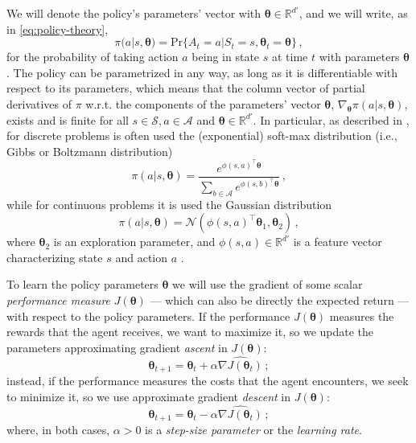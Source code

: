 We will denote the policy's parameters' vector with $\boldsymbol \theta \in \mathbb R^{d'}$, and we will write, as in \eqref{eq:policy-theory},
\begin{equation}
    \pi(a|s,\boldsymbol \theta) = \text{Pr}\{A_t = a | S_t = s, \boldsymbol \theta_t = \boldsymbol {\theta}\} \, ,
    \label{eq:policy-with-parameters}
\end{equation}
for the probability of taking action $a$ being in state $s$ at time $t$ with parameters $\boldsymbol \theta$ \cite{SuttonBarto}. The policy can be parametrized in any way, as long as it is differentiable with respect to its parameters, which means that the column vector of partial derivatives of $\pi$ w.r.t. the components of the parameters' vector $\boldsymbol \theta$, $\nabla_{\boldsymbol \theta} \pi (a|s,\boldsymbol \theta)$, exists and is finite for all $s \in \mathcal S, a \in \mathcal A$ and $\boldsymbol \theta \in \mathbb R^{d'}$. In particular, as described in \cite{Peters2010}, for discrete problems is often used the (exponential) soft-max distribution (i.e., Gibbs or Boltzmann distribution)
\begin{equation}
    \pi(a|s, \boldsymbol \theta) = \frac{e^{\phi(s,a)^\top \boldsymbol \theta}}{\sum_{b \in \mathcal A} e^{\phi(s,b)^\top \boldsymbol \theta}} \, ,
    \label{eq:pi-boltzmann}
\end{equation}
while for continuous problems it is used the Gaussian distribution
\begin{equation}
    \pi(a|s, \boldsymbol \theta) = \mathcal N(\phi(s,a)^\top \boldsymbol \theta_1, \boldsymbol \theta_2) \, ,
\end{equation}
where $\boldsymbol \theta_2$ is an exploration parameter, and $\phi(s,a) \in \mathbb R^{d'}$ is a feature vector characterizing state $s$ and action $a$ \cite{Sutton2000}.

To learn the policy parameters $\boldsymbol \theta$ we will use the  gradient of some scalar \emph{performance measure} $J(\boldsymbol \theta)$ --- which can also be directly the expected return --- with respect to the policy parameters. If the performance $J(\boldsymbol \theta)$ measures the rewards that the agent receives, we want to maximize it, so we update the parameters approximating gradient \textit{ascent} in $J(\boldsymbol \theta)$:
\begin{equation}
    \boldsymbol \theta_{t+1} = \boldsymbol \theta_t + \alpha \widehat{\nabla J(\boldsymbol \theta_t)} \, ;
    \label{eq:grad-ascent}
\end{equation}
instead, if the performance measures the costs that the agent encounters, we seek to minimize it, so we use approximate gradient \textit{descent} in $J(\boldsymbol \theta)$:
\begin{equation}
    \boldsymbol \theta_{t+1} = \boldsymbol \theta_t - \alpha \widehat{\nabla J(\boldsymbol \theta_t)} \, ;
    \label{eq:grad-descent}
\end{equation}
where, in both cases, $\alpha > 0$ is a \emph{step-size parameter} or the \emph{learning rate}.

